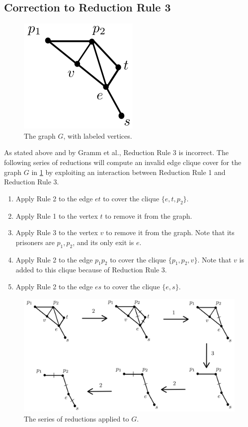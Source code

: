 \documentclass[12pt]{article}
\begin{document}
\subsection*{Correction to Reduction Rule 3}

    \begin{figure}[hbt!]\begin{center}\includegraphics[scale=.6]{g.png}\end{center} \caption{The graph $G$, with labeled vertices.} \label{fig:rulethreebad}\end{figure}
    As stated above and by Gramm et al., Reduction Rule 3 is incorrect.
    The following series of reductions will compute an invalid edge clique cover for the graph $G$ in \ref{fig:rulethreebad} by exploiting an interaction between Reduction Rule 1 and Reduction Rule 3.
    \begin{enumerate}
        \item Apply Rule 2 to the edge $et$ to cover the clique $\{e, t, p_2\}$.
        \item Apply Rule 1 to the vertex $t$ to remove it from the graph.
        \item Apply Rule 3 to the vertex $v$ to remove it from the graph. Note that its prisoners are $p_1, p_2$, and its only exit is $e$.
        \item Apply Rule 2 to the edge $p_1p_2$ to cover the clique $\{p_1, p_2, v\}$. Note that $v$ is added to this clique because of Reduction Rule 3.
        \item Apply Rule 2 to the edge $es$ to cover the clique $\{e, s\}$.
    \end{enumerate}
    
    \begin{figure}[hbt!]
        \begin{center}\includegraphics[width=\linewidth]{rule_three_failure.png}\end{center}
            \caption{The series of reductions applied to $G$.}
    \end{figure}
\end{document}
